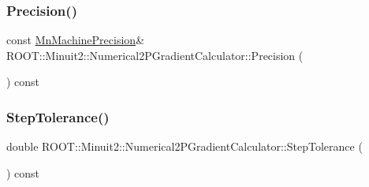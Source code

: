 \subsubsection{\texorpdfstring{Precision()}{Precision()}\hspace{0.1cm}{\footnotesize\ttfamily [3/3]}}
{\footnotesize\ttfamily const \mbox{\hyperlink{classROOT_1_1Minuit2_1_1MnMachinePrecision}{Mn\+Machine\+Precision}}\& R\+O\+O\+T\+::\+Minuit2\+::\+Numerical2\+P\+Gradient\+Calculator\+::\+Precision (\begin{DoxyParamCaption}{ }\end{DoxyParamCaption}) const}

\mbox{\label{classROOT_1_1Minuit2_1_1Numerical2PGradientCalculator_afb1bbda7e079db02b02b790e0b0f6cca}} 
\subsubsection{\texorpdfstring{StepTolerance()}{StepTolerance()}\hspace{0.1cm}{\footnotesize\ttfamily [1/3]}}
{\footnotesize\ttfamily double R\+O\+O\+T\+::\+Minuit2\+::\+Numerical2\+P\+Gradient\+Calculator\+::\+Step\+Tolerance (\begin{DoxyParamCaption}{ }\end{DoxyParamCaption}) const}

